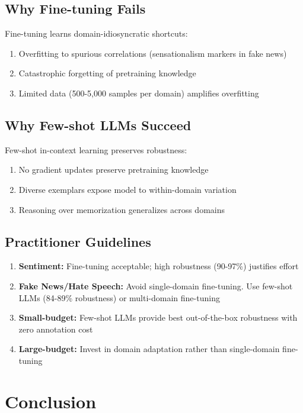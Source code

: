 \documentclass[10pt,twocolumn,journal]{IEEEtran}
\begin{document}
\subsection{Why Fine-tuning Fails}

Fine-tuning learns domain-idiosyncratic shortcuts:
\begin{enumerate}
\item Overfitting to spurious correlations (sensationalism markers in fake news)
\item Catastrophic forgetting of pretraining knowledge
\item Limited data (500-5,000 samples per domain) amplifies overfitting
\end{enumerate}

\subsection{Why Few-shot LLMs Succeed}

Few-shot in-context learning preserves robustness:
\begin{enumerate}
\item No gradient updates preserve pretraining knowledge
\item Diverse exemplars expose model to within-domain variation
\item Reasoning over memorization generalizes across domains
\end{enumerate}

\subsection{Practitioner Guidelines}

\begin{enumerate}
\item \textbf{Sentiment:} Fine-tuning acceptable; high robustness (90-97\%) justifies effort
\item \textbf{Fake News/Hate Speech:} Avoid single-domain fine-tuning. Use few-shot LLMs (84-89\% robustness) or multi-domain fine-tuning
\item \textbf{Small-budget:} Few-shot LLMs provide best out-of-the-box robustness with zero annotation cost
\item \textbf{Large-budget:} Invest in domain adaptation rather than single-domain fine-tuning
\end{enumerate}

\section{Conclusion}
\end{document}
